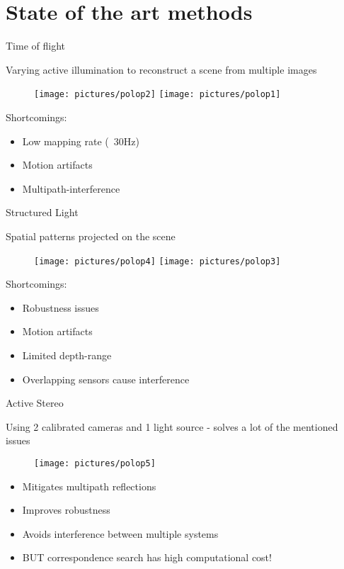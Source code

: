 %
%
\section{State of the art methods}
\begin{frame}{Time of flight}

Varying active illumination to reconstruct a scene from multiple images
\begin{figure}
\texttt{[image: pictures/polop2]}
\texttt{[image: pictures/polop1]}
\end{figure}
Shortcomings:
\begin{itemize}
\item Low mapping rate (~30Hz)
\item Motion artifacts
\item Multipath-interference
\end{itemize}
\end{frame}


\begin{frame}{Structured Light}

Spatial patterns projected on the scene
\begin{figure}
\texttt{[image: pictures/polop4]}
\texttt{[image: pictures/polop3]}
\end{figure}
Shortcomings:
\begin{itemize}
\item Robustness issues
\item Motion artifacts
\item Limited depth-range
\item Overlapping sensors cause interference
\end{itemize}
\end{frame}




\begin{frame}{Active Stereo}

Using 2 calibrated cameras and 1 light source - solves a lot of the mentioned issues
\begin{figure}
\texttt{[image: pictures/polop5]}
\end{figure}
\begin{itemize}
\item Mitigates multipath reflections
\item Improves robustness
\item Avoids interference between multiple systems
\item BUT correspondence search has high computational cost!
\end{itemize}

\end{frame}


